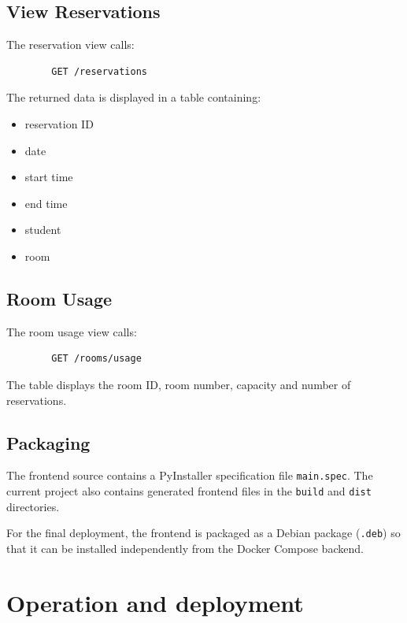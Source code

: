 \documentclass[10pt,a4paper]{article}
\begin{document}
	\subsection*{View Reservations}
	
	The reservation view calls:
	
	\begin{lstlisting}
		GET /reservations
	\end{lstlisting}
	
	The returned data is displayed in a table containing:
	
	\begin{itemize}[leftmargin=6mm,itemsep=2pt]
		\item reservation ID
		\item date
		\item start time
		\item end time
		\item student
		\item room
	\end{itemize}
	
	\subsection*{Room Usage}
	
	The room usage view calls:
	
	\begin{lstlisting}
		GET /rooms/usage
	\end{lstlisting}
	
	The table displays the room ID, room number, capacity and number of
	reservations.
	
	\subsection*{Packaging}
	
	The frontend source contains a PyInstaller specification file
	\texttt{main.spec}. The current project also contains generated
	frontend files in the \texttt{build} and \texttt{dist} directories.
	
	For the final deployment, the frontend is packaged as a Debian
	package (\texttt{.deb}) so that it can be installed independently
	from the Docker Compose backend.
	
	
	
	\section{Operation and deployment}
	
\end{document}
